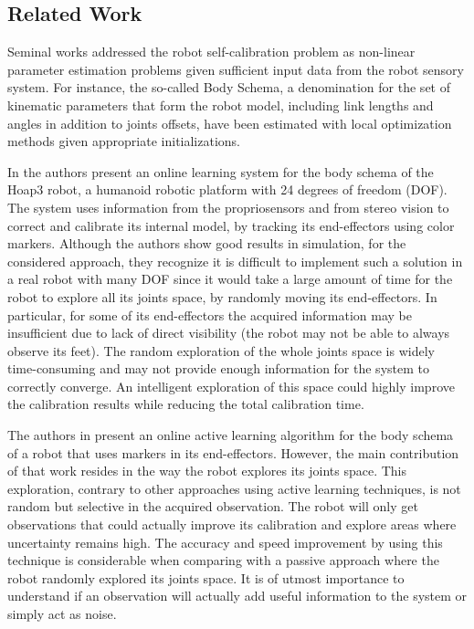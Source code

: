 \subsection{Related Work}




Seminal works addressed the robot self-calibration problem as non-linear parameter estimation problems given sufficient input data from the robot sensory system. For instance, the so-called Body Schema, a denomination for the set of kinematic parameters that form the robot model, including link lengths and angles in addition to joints offsets, have been estimated with local optimization methods given appropriate initializations. 

In \cite{Hersch08} the authors present an online learning system for the body schema of the Hoap3 robot, a humanoid robotic platform with 24 degrees of freedom (DOF). The system uses information from the propriosensors and from stereo vision to correct and calibrate its internal model, by tracking its end-effectors using color markers. Although the authors show good results in simulation, for the considered approach, they recognize it is difficult to implement such a solution in a real robot with many DOF since it would take a large amount of time for the robot to explore all its joints space, by randomly moving its end-effectors. In particular, for some of its end-effectors the acquired information may be insufficient due to lack of direct visibility (the robot may not be able to always observe its feet). The random exploration of the whole joints space is widely time-consuming and may not provide enough information for the system to correctly converge. An intelligent exploration of this space could highly improve the calibration results while reducing the total calibration time. 

The authors in \cite{Cantin10} present an online active learning algorithm for the body schema of a robot that uses markers in its end-effectors. However, the main contribution of that work resides in the way the robot explores its joints space. This exploration, contrary to other approaches using active learning techniques, is not random but selective in the acquired observation. The robot will only get observations that could actually improve its calibration and explore areas where uncertainty remains high. The accuracy and speed improvement by using this technique is considerable when comparing with a passive approach where the robot randomly explored its joints space. It is of utmost importance to understand if an observation will actually add useful information to the system or simply act as noise. 

